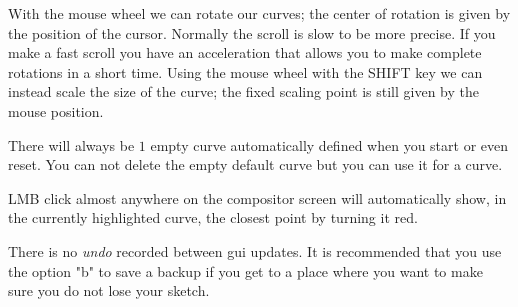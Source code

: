 With the mouse wheel we can rotate our curves; the center of rotation is given by the position of the cursor. Normally the scroll is slow to be more precise. If you make a fast scroll you have an acceleration that allows you to make complete rotations in a short time. Using the mouse wheel with the SHIFT key we can instead scale the size of the curve; the fixed scaling point is still given by the mouse position.

There will always be $1$ empty curve automatically defined when you start or even reset.
You can not delete the empty default curve but you can use it for a curve.

LMB click almost anywhere on the compositor screen will automatically show, in the currently highlighted curve, the closest point by turning it red.

There is no \textit{undo} recorded between gui updates. It is recommended that you use the option "b" to save a backup if you get to a place where you want to make sure you do not lose your sketch.

